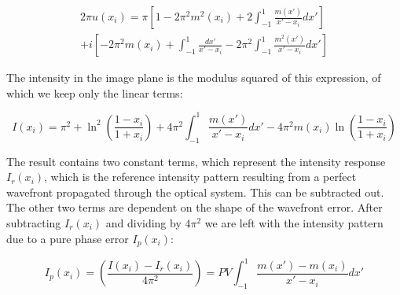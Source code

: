 \begin{multline}
    2\pi u(x_i ) = 
    \pi 
    \left[ 
        1-2\pi^2 m^2 (x_i )+2\int_{-1}^1 \frac{m(x')}{x'-x_i} dx'
    \right] \\
    +   i \left[
        -2\pi^2 m(x_i)+\int_{-1}^1\frac{dx'}{x'-x_i}
        -
        2\pi^2\int_{-1}^1\frac{m^2(x')}{x'-x_i}dx'
    \right]
\end{multline}



The intensity in the image plane is the modulus squared of this expression, of which we keep only the linear terms:


\begin{equation}
    I(x_i) = \pi^2 + \ln^2 \left(
        \frac{1-x_i}{1+x_i}
    \right)
    +
    4 \pi^2 \int_{-1}^1 \frac{m(x')}{x'-x_i} dx'
    -
    4\pi^2 m(x_i) \ln\left(
        \frac{1-x_i}{1+x_i}
    \right)
\end{equation}

The result contains two constant terms, which represent the intensity response $I_r(x_i )$, which is the reference intensity pattern resulting from a perfect wavefront propagated through the optical system. This can be subtracted out. The other two terms are dependent on the shape of the wavefront error. After subtracting  $I_r (x_i )$ and dividing by $4\pi^2$ we are left with the intensity pattern due to a pure phase error $I_p(x_i)$:


\begin{equation}
    I_p(x_i) = \left(\frac{I(x_i) - I_r(x_i)}{4\pi^2}\right)=
     PV \int_{-1}^1 \frac{m(x')-m(x_i)}{x'-x_i}dx'
\end{equation}    


